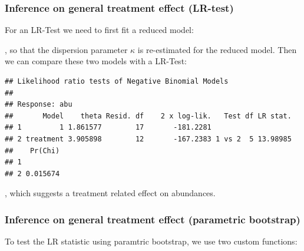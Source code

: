 \subsubsection{Inference on general treatment effect (LR-test)}
For an LR-Test we need to first fit a reduced model:
\begin{knitrout}
\color{fgcolor}\small\begin{kframe}
\begin{alltt}
 \hlkwb{<-}  \hlopt{~} \hlstd{,}  
\end{alltt}
\end{kframe}
\end{knitrout}

, so that the dispersion parameter $\kappa$ is re-estimated for the reduced model.
Then we can compare these two models with a LR-Test:
\begin{knitrout}
\color{fgcolor}\small\begin{kframe}
\begin{alltt}
  \hlstd{=} \hlstd{)}
\end{alltt}
\begin{verbatim}
## Likelihood ratio tests of Negative Binomial Models
## 
## Response: abu
##       Model    theta Resid. df    2 x log-lik.   Test df LR stat.
## 1         1 1.861577        17       -181.2281                      
## 2 treatment 3.905898        12       -167.2383 1 vs 2  5 13.98985
##    Pr(Chi)
## 1         
## 2 0.015674
\end{verbatim}
\end{kframe}
\end{knitrout}
, which suggests a treatment related effect on abundances.


\subsubsection{Inference on general treatment effect (parametric bootstrap)}

To test the LR statistic using paramtric bootstrap, we use two custom functions:

